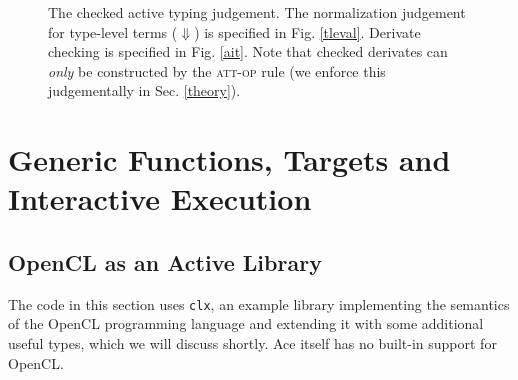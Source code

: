 \documentclass[10pt,preprint]{sigplanconf}
\begin{document}
{\begin{figure}[t]
\begin{mathpar}

\end{mathpar}
\caption{\small The checked active typing judgement. The normalization judgement for type-level terms ($\Downarrow$) is specified in Fig. \ref{tleval}. Derivate checking is specified in Fig. \ref{ait}. Note that checked derivates can \emph{only} be constructed by the \textsc{att-op} rule (we enforce this judgementally in Sec. \ref{theory}).}
\label{absatt}
\end{figure}


\section{Generic Functions, Targets and Interactive Execution}\label{targets}
\subsection{OpenCL as an Active Library}
The code in this section uses \verb|clx|, an example library implementing the semantics of the OpenCL programming language and extending it with some additional useful types, which we will discuss shortly. Ace itself has no built-in support for OpenCL.

}
\end{document}

